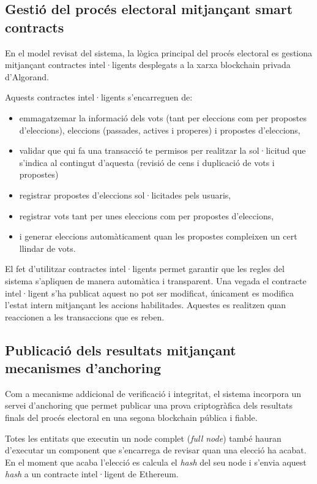\documentclass[12pt,a4paper]{article}
\begin{document}
\subsection{Gestió del procés electoral mitjançant smart contracts}

En el model revisat del sistema, la lògica principal del procés electoral es gestiona mitjançant contractes intel·ligents desplegats a la xarxa blockchain privada d'Algorand.

Aquests contractes intel·ligents s'encarreguen de:

\begin{itemize}
\item emmagatzemar la informació dels vots (tant per eleccions com per propostes d'eleccions), eleccions (passades, actives i properes) i propostes d'eleccions,
\item validar que qui fa una transacció te permisos per realitzar la sol·licitud que s'indica al contingut d'aquesta (revisió de cens i duplicació de vots i propostes)
\item registrar propostes d'eleccions sol·licitades pels usuaris,
\item registrar vots tant per unes eleccions com per propostes d'eleccions,
\item i generar eleccions automàticament quan les propostes compleixen un cert llindar de vots.
\end{itemize}

El fet d'utilitzar contractes intel·ligents permet garantir que les regles del sistema s'apliquen de manera automàtica i transparent. Una vegada el contracte intel·ligent s'ha publicat aquest no pot ser modificat, únicament es modifica l'estat intern mitjançant les accions habilitades. Aquestes es realitzen quan reaccionen a les transaccions que es reben.

\subsection{Publicació dels resultats mitjançant mecanismes d'anchoring}

Com a mecanisme addicional de verificació i integritat, el sistema incorpora un servei d'anchoring que permet publicar una prova criptogràfica dels resultats finals del procés electoral en una segona blockchain pública i fiable.

Totes les entitats que executin un node complet (\textit{full node}) també hauran d'executar un component que s'encarrega de revisar quan una elecció ha acabat. En el moment que acaba l'elecció es calcula el \textit{hash} del seu node i s'envia aquest \textit{hash} a un contracte intel·ligent de Ethereum.
\end{document}
